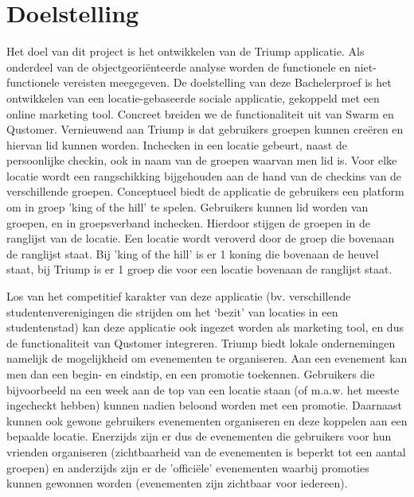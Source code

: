 
\chapter{Doelstelling}

Het doel van dit project is het ontwikkelen van de Triump applicatie. Als onderdeel van de objectgeoriënteerde analyse worden de functionele en niet-functionele vereisten meegegeven.
De doelstelling van deze Bachelerproef is het ontwikkelen van een locatie-gebaseerde sociale applicatie, gekoppeld met een online marketing tool. Concreet breiden we de functionaliteit uit van Swarm en Qustomer. Vernieuwend aan Triump is dat gebruikers groepen kunnen creëren en hiervan lid kunnen worden. Inchecken in een locatie gebeurt, naast de persoonlijke checkin, ook in naam van de groepen waarvan men lid is. 
Voor elke locatie wordt een rangschikking bijgehouden aan de hand van de checkins van de verschillende groepen. Conceptueel biedt de applicatie de gebruikers een platform om in groep 'king of the hill' te spelen. Gebruikers kunnen lid worden van groepen, en in groepsverband inchecken. Hierdoor stijgen de groepen in de ranglijst van de locatie. Een locatie wordt veroverd door de groep die bovenaan de ranglijst staat.
Bij 'king of the hill' is er 1 koning die bovenaan de heuvel staat, bij Triump is er 1 groep die voor een locatie bovenaan de ranglijst staat.

Los van het competitief karakter van deze applicatie (bv. verschillende studentenverenigingen die strijden om het ‘bezit’ van locaties in een studentenstad) kan deze applicatie ook ingezet worden als marketing tool, en dus de functionaliteit van Qustomer integreren.
Triump biedt lokale ondernemingen namelijk de mogelijkheid om evenementen te organiseren. Aan een evenement kan men dan een begin- en eindstip, en een promotie toekennen. Gebruikers die bijvoorbeeld na een week aan de top van een locatie staan (of m.a.w. het meeste ingecheckt hebben) kunnen nadien beloond worden met een promotie. Daarnaast kunnen ook gewone gebruikers evenementen organiseren en deze koppelen aan een bepaalde locatie.
Enerzijds zijn er dus de evenementen die gebruikers voor hun vrienden organiseren (zichtbaarheid van de evenementen is beperkt tot een aantal groepen) en anderzijds zijn er de 'officiële' evenementen waarbij promoties kunnen gewonnen worden (evenementen zijn zichtbaar voor iedereen). 

